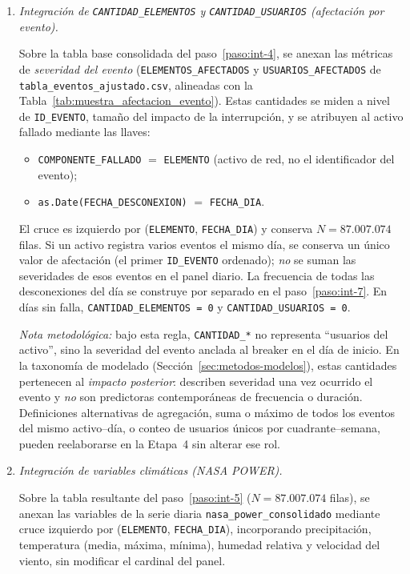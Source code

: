 {\begin{enumerate}
        \item\label{paso:int-5} \textit{Integración de \texttt{CANTIDAD\_ELEMENTOS} y \texttt{CANTIDAD\_USUARIOS} (afectación por evento).}\mbox{}\par\vspace{0.2em}\noindent
        Sobre la tabla base consolidada del paso~\ref{paso:int-4}, se anexan las métricas de \textit{severidad del evento} (\texttt{ELEMENTOS\_AFECTADOS} y \texttt{USUARIOS\_AFECTADOS} de \texttt{tabla\_eventos\_ajustado.csv}, alineadas con la Tabla~\ref{tab:muestra_afectacion_evento}). Estas cantidades se miden a nivel de \texttt{ID\_EVENTO}, tamaño del impacto de la interrupción, y se atribuyen al activo fallado mediante las llaves:
        \begin{itemize}
            \item \texttt{COMPONENTE\_FALLADO} $=$ \texttt{ELEMENTO} (activo de red, no el identificador del evento);
            \item \texttt{as.Date(FECHA\_DESCONEXION)} $=$ \texttt{FECHA\_DIA}.
        \end{itemize}
        El cruce es izquierdo por (\texttt{ELEMENTO}, \texttt{FECHA\_DIA}) y conserva $N = 87{.}007{.}074$ filas. Si un activo registra varios eventos el mismo día, se conserva un único valor de afectación (el primer \texttt{ID\_EVENTO} ordenado); \textit{no} se suman las severidades de esos eventos en el panel diario. La frecuencia de todas las desconexiones del día se construye por separado en el paso~\ref{paso:int-7}. En días sin falla, \texttt{CANTIDAD\_ELEMENTOS = 0} y \texttt{CANTIDAD\_USUARIOS = 0}.
        
        \noindent\textit{Nota metodológica:} bajo esta regla, \texttt{CANTIDAD\_*} no representa ``usuarios del activo'', sino la severidad del evento anclada al breaker en el día de inicio. En la taxonomía de modelado (Sección~\ref{sec:metodos-modelos}), estas cantidades pertenecen al \textit{impacto posterior}: describen severidad una vez ocurrido el evento y \textit{no} son predictoras contemporáneas de frecuencia o duración. Definiciones alternativas de agregación, suma o máximo de todos los eventos del mismo activo--día, o conteo de usuarios únicos por cuadrante--semana, pueden reelaborarse en la Etapa~4 sin alterar ese rol.
    
        \item\label{paso:int-6} \textit{Integración de variables climáticas (NASA POWER).}\mbox{}\par\vspace{0.2em}\noindent
        Sobre la tabla resultante del paso~\ref{paso:int-5} ($N = 87{.}007{.}074$ filas), se anexan las variables de la serie diaria \texttt{nasa\_power\_consolidado} mediante cruce izquierdo por (\texttt{ELEMENTO}, \texttt{FECHA\_DIA}), incorporando precipitación, temperatura (media, máxima, mínima), humedad relativa y velocidad del viento, sin modificar el cardinal del panel.
    

\end{enumerate}}
